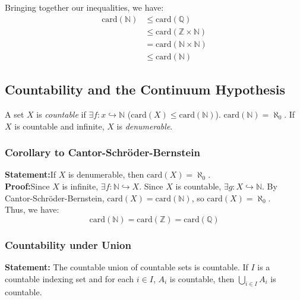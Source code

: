\documentclass[10pt]{extarticle}
\newcommand{\card}{\text{card}}
\newcommand{\N}{\mathbb{N}}
\newcommand{\Q}{\mathbb{Q}}
\newcommand{\Z}{\mathbb{Z}}
\begin{document}
      Bringing together our inequalities, we have:
      \begin{align*}
        \text{card}(\mathbb{N}) &\leq \text{card}(\mathbb{Q})\\
                                &\leq \text{card}(\mathbb{Z}\times \mathbb{N})\\
                                &=\text{card}(\mathbb{N}\times \mathbb{N})\\
                                &\leq \text{card}(\mathbb{N})
      \end{align*}
      \subsection{Countability and the Continuum Hypothesis}%
    A set $X$ is \textsl{countable} if $\exists f: x\hookrightarrow \N$ ($\card(X) \leq\card(\N)$). $\card(\N) = \aleph_0$. If $X$ is countable and infinite, $X$ is \textit{denumerable}.
    \subsubsection{Corollary to Cantor-Schröder-Bernstein}%
    \textbf{Statement:}If $X$ is denumerable, then $\card(X) = \aleph_0$.\\
      
    \textbf{Proof:}Since $X$ is infinite, $\exists f: \N\hookrightarrow X$. Since $X$ is countable, $\exists g: X\hookrightarrow \N$. By Cantor-Schröder-Bernstein, $\card(X) = \card(\N)$, so $\card(X) = \aleph_0$.\\

    Thus, we have: 
    \[
      \card(\N) = \card(\Z) = \card(\Q)
    \] 
    \subsubsection{Countability under Union}%
    \textbf{Statement:} The countable union of countable sets is countable. If $I$ is a countable indexing set and for each $i\in I$, $A_i$ is countable, then $\bigcup\limits_{i\in I} A_i$ is countable.\\
\end{document}
